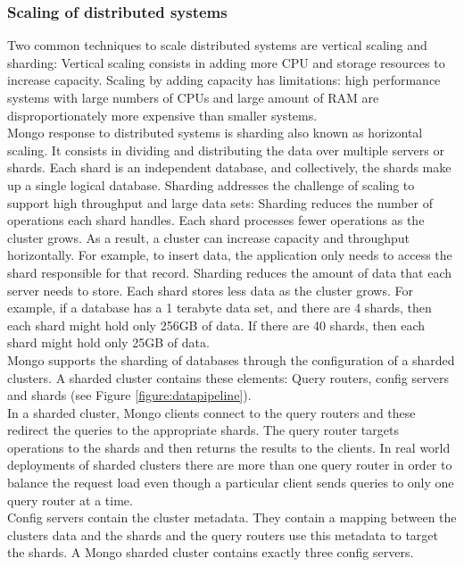 \documentclass[11pt, oneside]{article}   	%
\begin{document}
\subsubsection{Scaling of distributed systems}
Two common techniques to scale distributed systems are vertical scaling and sharding:
Vertical scaling consists in adding more CPU and storage resources to increase capacity. Scaling by adding capacity has limitations: high performance systems with large numbers of CPUs and large amount of RAM are disproportionately more expensive than smaller systems.\\
Mongo response to distributed systems is sharding also known as horizontal scaling. It consists in dividing and distributing the data over multiple servers or shards. Each shard is an independent database, and collectively, the shards make up a single logical database. Sharding addresses the challenge of scaling to support high throughput and large data sets:
Sharding reduces the number of operations each shard handles. Each shard processes fewer operations as the cluster grows. As a result, a cluster can increase capacity and throughput horizontally.
For example, to insert data, the application only needs to access the shard responsible for that record.
Sharding reduces the amount of data that each server needs to store. Each shard stores less data as the cluster grows.
For example, if a database has a 1 terabyte data set, and there are 4 shards, then each shard might hold only 256GB of data. If there are 40 shards, then each shard might hold only 25GB of data.\\
Mongo supports the sharding of databases through the configuration of a sharded clusters. A sharded cluster contains these elements: Query routers, config servers and shards (see Figure \ref{figure:datapipeline}).\\
In a sharded cluster, Mongo clients connect to the query routers and these redirect the queries to the appropriate shards. The query router targets operations to the shards and then returns the results to the clients. In real world deployments of sharded clusters there are more than one query router in order to balance the request load even though a particular client sends queries to only one query router at a time.\\
Config servers contain the cluster metadata. They contain a mapping between the clusters data and the shards and the query routers use this metadata to target the shards. A Mongo sharded cluster contains exactly three config servers.\\
\end{document}
